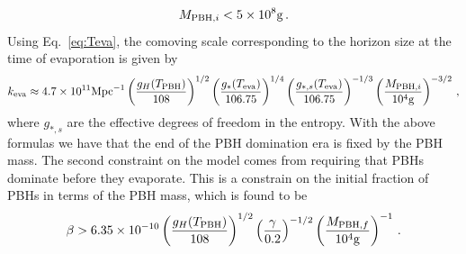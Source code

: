 \documentclass[a4paper,11pt]{article}
\numberwithin{equation}{section}
\begin{document}
\begin{align}\label{eq:boundonmassBBN}
M_{{\rm PBH},i}<5\times 10^8{\rm g}\,.
\end{align} 
Using Eq.~\eqref{eq:Teva}, the comoving scale corresponding to the horizon size at the time of evaporation is given by
\begin{align}\label{eq:keva}
k_{\rm eva}\approx 4.7\times 10^{11}{\rm Mpc}^{-1}\left(\frac{g_H(T_{\rm PBH})}{108}\right)^{1/2}\left(\frac{g_*(T_{\rm eva})}{106.75}\right)^{1/4}\left(\frac{g_{*,s}(T_{\rm eva})}{106.75}\right)^{-1/3}\left(\frac{M_{{\rm PBH},i}}{10^4{\rm g}}\right)^{-3/2}\,,
\end{align}
where $g_{*,s}$ are the effective degrees of freedom in the entropy. With the above formulas we have that the end of the PBH domination era is fixed by the PBH mass. The second constraint on the model comes from requiring that PBHs dominate before they evaporate. This is a constrain on the initial fraction of PBHs in terms of the PBH mass, which is found to be \cite{Inomata:2020lmk,Domenech:2020ssp} 
\begin{align}\label{eq:betamin}
\beta>6.35\times10^{-10}\left(\frac{g_H(T_{\rm PBH})}{108}\right)^{1/2}
\left(\frac{\gamma}{0.2}\right)^{-1/2}\left(\frac{M_{{\rm PBH},f}}{10^4{\rm g}}\right)^{-1}\,.
\end{align}
\end{document}
